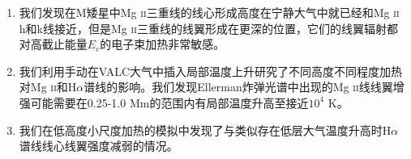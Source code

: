 \begin{enumerate}
	\item 我们发现在M矮星中Mg \textsc{ii}三重线的线心形成高度在宁静大气中就已经和Mg \textsc{ii} h和k线接近，但是Mg \textsc{ii}三重线的线翼形成在更深的位置，它们的线翼辐射都对高截止能量$E_c$的电子束加热非常敏感。
	\item 我们利用手动在VALC大气中插入局部温度上升研究了不同高度不同程度加热对Mg \textsc{ii}和H$\alpha$谱线的影响。我们发现Ellerman炸弹光谱中出现的Mg \textsc{ii}线线翼增强可能需要在0.25-1.0 Mm的范围内有局部温度升高至接近$10^4$ K。
	\item 我们在低高度小尺度加热的模拟中发现了与\textcites{Hong2017b}类似存在低层大气温度升高时H$\alpha$谱线线心线翼强度减弱的情况。
\end{enumerate}


